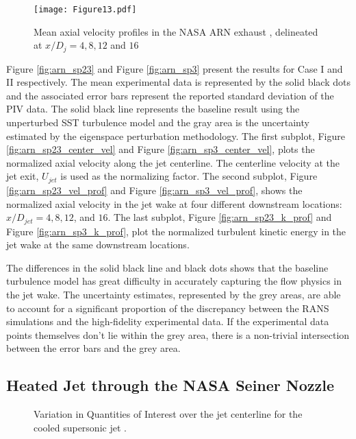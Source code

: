\begin{figure}
\texttt{[image: Figure13.pdf]}
\caption{Mean axial velocity profiles in the NASA ARN exhaust , delineated at $x/D_j= 4,8,12$ and $16$\label{fig:fig5}}
\end{figure}

Figure \ref{fig:arn_sp23} and Figure \ref{fig:arn_sp3} present the results for Case I and II respectively. The mean experimental data is represented by the solid black dots and the associated error bars represent the reported standard deviation of the PIV data. The solid black line represents the baseline result using the unperturbed SST turbulence model and the gray area is the uncertainty estimated by the eigenspace perturbation methodology. The first subplot, Figure \ref{fig:arn_sp23_center_vel} and Figure \ref{fig:arn_sp3_center_vel}, plots the normalized axial velocity along the jet centerline. The centerline velocity at the jet exit, $U_{jet}$ is used as the normalizing factor. The second subplot, Figure \ref{fig:arn_sp23_vel_prof} and Figure \ref{fig:arn_sp3_vel_prof}, shows the normalized axial velocity in the jet wake at four different downstream locations: $x/D_{jet}= 4, 8, 12$, and $16$. The last subplot, Figure \ref{fig:arn_sp23_k_prof} and Figure \ref{fig:arn_sp3_k_prof}, plot the normalized turbulent kinetic energy in the jet wake at the same downstream locations. 

The differences in the solid black line and black dots shows that the baseline turbulence model has great difficulty in accurately capturing the flow physics in the jet wake.  The uncertainty estimates, represented by the grey areas, are able to account for a significant proportion of the discrepancy between the RANS simulations and the high-fidelity experimental data. If the experimental data points themselves don't lie within the grey area, there is a non-trivial intersection between the error bars and the grey area. 

\subsection{Heated Jet through the NASA Seiner Nozzle}


\begin{figure}
\caption{Variation in Quantities of Interest over the jet centerline for the cooled supersonic jet \cite{seiner}.}
\end{figure}

